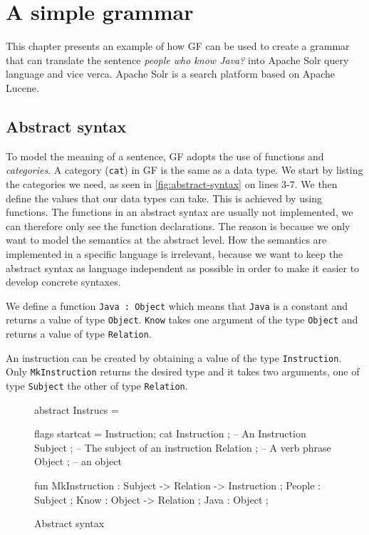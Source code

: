 \chapter{A simple grammar}\label{ch:simple-grammar}
This chapter presents an example of how GF can be used to create a grammar that can translate the sentence \emph{people who know Java?} into Apache Solr query language and vice verca. Apache Solr is a search platform based on Apache Lucene.

\section{Abstract syntax}
To model the meaning of a sentence, GF adopts the use of functions and \emph{categories}. A category (\texttt{cat}) in GF is the same as a data type. We start by listing the categories we need, as seen in \autoref{fig:abstract-syntax} on lines 3-7. We then define the values that our data types can take. This is achieved by using functions. The functions in an abstract syntax are usually not implemented, we can therefore only see the function declarations. The reason is because we only want to model the semantics at the abstract level. How the semantics are implemented in a specific language is irrelevant, because we want to keep the abstract syntax as language independent as possible in order to make it easier to develop concrete syntaxes.

We define a function \texttt{Java : Object} which means that \texttt{Java} is a constant  and returns a value of type \texttt{Object}. \texttt{Know} takes one argument of the type \texttt{Object} and returns a value of type \texttt{Relation}.

An instruction can be created by obtaining a value of the type \texttt{Instruction}. Only \texttt{MkInstruction} returns the desired type and it takes two arguments, one of type \texttt{Subject} the other of type \texttt{Relation}.

\begin{figure}[h]
\begin{code}
abstract Instrucs = { 
  flags startcat = Instruction; 
  cat
    Instruction ; -- An Instruction
    Subject ;     -- The subject of an instruction
    Relation ;    -- A verb phrase
    Object ;      -- an object

  fun		 	  
    MkInstruction : Subject -> Relation -> Instruction ;
    People : Subject ;
    Know : Object -> Relation ;
    Java : Object ; 
}
\end{code}
\caption{Abstract syntax\label{fig:abstract-syntax}}
\end{figure}

